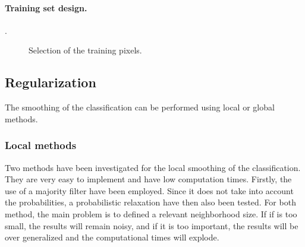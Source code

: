 \paragraph{Training set design. \\}.

\begin{figure}[htbp]
\begin{center}
\begingroup
\captionsetup[subfigure]{width=0.45\textwidth}
\hspace*{0.025\textwidth}
\endgroup
\caption{Selection of the training pixels.}
\label{fig:C3_S3_ss3_sel}
\end{center}
\end{figure}

\subsection{Regularization}
The smoothing of the classification can be performed using local or global methods.

\subsubsection{Local methods}
Two methods have been investigated for the local smoothing of the classification. They are very easy to implement and have low computation times.
Firstly, the use of a majority filter have been employed. Since it does not take into account the probabilities, a probabilistic relaxation have then also been tested. For both method, the main problem is to defined a relevant neighborhood size. If if is too small, the results will remain noisy, and if it is too important, the results will be over generalized and the computational times will explode.


